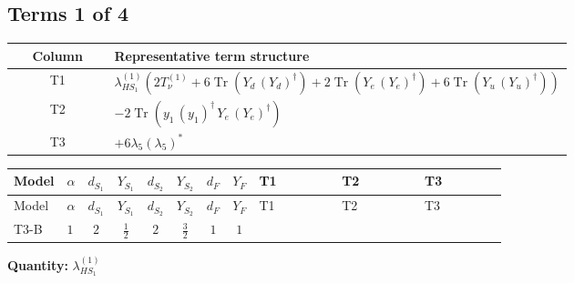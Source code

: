 \documentclass[8pt]{article}
\begin{document}
\begin{landscape}
\subsection*{Terms 1 of 4}
\begin{center}
\begin{tabular}{@{}c >{\raggedright\arraybackslash}p{0.82\linewidth}@{}}
\toprule
Column & Representative term structure \\
\midrule
T1 & \(\displaystyle {\lambda_{HS_1}^{(1)}} (2 T_{\nu}^{(1)}+6 \operatorname{Tr}\!\left({Y_d}\,\left({Y_d}\right)^{\dagger}\right)+2 \operatorname{Tr}\!\left({Y_e}\,\left({Y_e}\right)^{\dagger}\right)+6 \operatorname{Tr}\!\left({Y_u}\,\left({Y_u}\right)^{\dagger}\right))\) \\
\midrule
T2 & \(\displaystyle -2 \operatorname{Tr}\!\left({y_1}\,\left({y_1}\right)^{\dagger}\,{Y_e}\,\left({Y_e}\right)^{\dagger}\right)\) \\
\midrule
T3 & \(\displaystyle +6 {\lambda_5} \left({\lambda_5}\right)^{*}\) \\
\midrule
\bottomrule
\end{tabular}
\end{center}
\smallskip
\tiny
\begin{longtable}{@{}llcccccc >{\raggedright\arraybackslash}p{0.21\linewidth} >{\raggedright\arraybackslash}p{0.21\linewidth} >{\raggedright\arraybackslash}p{0.21\linewidth}@{}}
\toprule
Model & $\alpha$ & $d_{S_1}$ & $Y_{S_1}$ & $d_{S_2}$ & $Y_{S_2}$ & $d_F$ & $Y_F$ & T1 & T2 & T3 \\
\midrule
\endfirsthead
\toprule
Model & $\alpha$ & $d_{S_1}$ & $Y_{S_1}$ & $d_{S_2}$ & $Y_{S_2}$ & $d_F$ & $Y_F$ & T1 & T2 & T3 \\
\midrule
\endhead
T3-B & $1$ & $2$ & $\frac{1}{2}$ & $2$ & $\frac{3}{2}$ & $1$ & $1$ & \scriptsize\adjustbox{max width=\linewidth}{$\begin{gathered} {\lambda_{HS_1}^{(1)}} (2 T_{\nu}^{(1)}+6 \operatorname{Tr}\!\left({Y_d}\,\left({Y_d}\right)^{\dagger}\right)+2 \operatorname{Tr}\!\left({Y_e}\,\left({Y_e}\right)^{\dagger}\right)+6 \operatorname{Tr}\!\left({Y_u}\,\left({Y_u}\right)^{\dagger}\right))\end{gathered}$} & \scriptsize\adjustbox{max width=\linewidth}{$\begin{gathered} -2 \operatorname{Tr}\!\left({y_1}\,\left({y_1}\right)^{\dagger}\,{Y_e}\,\left({Y_e}\right)^{\dagger}\right)\end{gathered}$} & \scriptsize\adjustbox{max width=\linewidth}{$\begin{gathered} +6 {\lambda_5} \left({\lambda_5}\right)^{*}\end{gathered}$} \\
\midrule
\bottomrule
\end{longtable}
\clearpage
\noindent\textbf{Quantity: }$\lambda_{HS_1}^{(1)}$\par\smallskip

\end{landscape}
\end{document}
